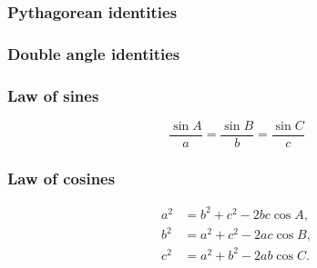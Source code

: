 \documentclass[11pt]{article}
\begin{document}
\subsubsection{Pythagorean identities}


\subsubsection{Double angle identities}


\subsubsection{Law of sines}


$$\frac{\sin A}{a}=\frac{\sin B}{b}=\frac{\sin C}{c}$$

\subsubsection{Law of cosines}


\begin{align*}
a^2 &= b^2 + c^2 - 2bc\cos A, \\
b^2 &= a^2 + c^2 - 2ac\cos B, \\
c^2 &= a^2 + b^2 - 2ab\cos C.
\end{align*}
\end{document}
